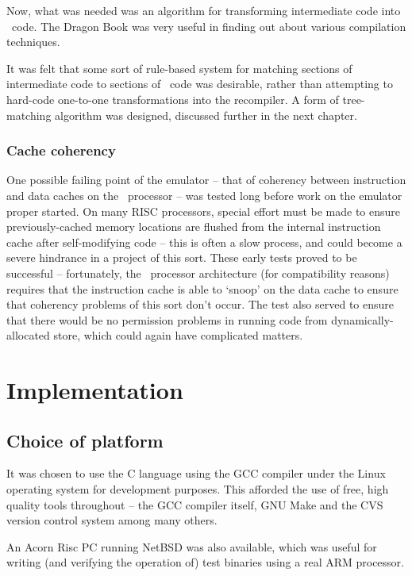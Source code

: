 Now, what was needed was an algorithm for transforming intermediate code into \ia\ code. The Dragon Book \cite{Dragon9X} was very useful in finding out about various compilation techniques.

It was felt that some sort of rule-based system for matching sections of intermediate code to sections of \ia\ code was desirable, rather than attempting to hard-code one-to-one transformations into the recompiler. A form of tree-matching algorithm was designed, discussed further in the next chapter.

\subsubsection{Cache coherency}

One possible failing point of the emulator -- that of coherency between instruction and data caches on the \ia\ processor -- was tested long before work on the emulator proper started. On many RISC processors, special effort must be made to ensure previously-cached memory locations are flushed from the internal instruction cache after self-modifying code -- this is often a slow process, and could become a severe hindrance in a project of this sort. These early tests proved to be successful -- fortunately, the \ia\ processor architecture (for compatibility reasons) requires that the instruction cache is able to `snoop' on the data cache to ensure that coherency problems of this sort don't occur. The test also served to ensure that there would be no permission problems in running code from dynamically-allocated store, which could again have complicated matters.

\section{Implementation}

\subsection{Choice of platform}

It was chosen to use the C language using the GCC compiler under the Linux operating system for development purposes. This afforded the use of free, high quality tools throughout -- the GCC compiler itself, GNU Make and the CVS version control system among many others.

An Acorn Risc PC running NetBSD was also available, which was useful for writing (and verifying the operation of) test binaries using a real ARM processor.

